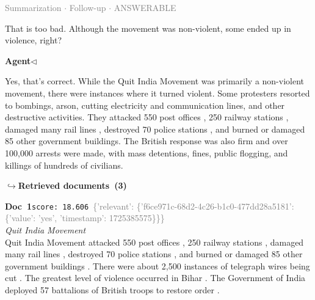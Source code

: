 \documentclass[a4paper,11pt]{article}
\begin{document}
\vspace{0.5em}
\hfill{\tiny\textcolor{gray}{Summarization $\cdot$ Follow-up $\cdot$ ANSWERABLE}}
\begin{userbubble}
That is too bad.  Although the movement was non-violent, some ended up in violence, right? 
\end{userbubble}
\noindent\hfill{\small\textcolor{agentcolor}{\textbf{Agent\enspace$\triangleleft$}}}
\begin{agentbubble}
Yes, that's correct. While the Quit India Movement was primarily a non-violent movement, there were instances where it turned violent. Some protesters resorted to bombings, arson, cutting electricity and communication lines, and other destructive activities. They attacked 550 post offices , 250 railway stations , damaged many rail lines , destroyed 70 police stations , and burned or damaged 85 other government buildings.  The British response was also firm and over 100,000 arrests were made,  with mass detentions, fines, public flogging, and killings of hundreds of civilians.
\end{agentbubble}
\noindent\hfill{\footnotesize\textcolor{doccolor}{\textbf{$\hookrightarrow$\enspace Retrieved documents~(3)}}}
\begin{docenv}
{\footnotesize\textcolor{doccolor}{\textbf{Doc~1}}}\hfill{\tiny\texttt{score:~18.606}}\ {\tiny\textcolor{gray}{\{'relevant': \{'f6ce971c-68d2-4c26-b1c0-477dd28a5181': \{'value': 'yes', 'timestamp': 1725385575\}\}\}}}\\[3pt]
{\small\textit{Quit India Movement}}\\[2pt]
\vspace{2pt}
{\footnotesize Quit India Movement
attacked 550 post offices , 250 railway stations , damaged many rail lines , destroyed 70 police stations , and burned or damaged 85 other government buildings . There were about 2,500 instances of telegraph wires being cut . The greatest level of violence occurred in Bihar . The Government of India deployed 57 battalions of British troops to restore order .}
\end{docenv}
\end{document}
